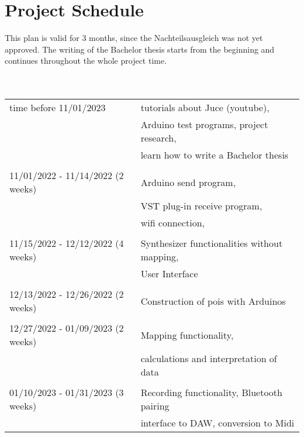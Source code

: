 \newpage
\section{Project Schedule}
This plan is valid for 3 months, since the Nachteilsausgleich was not yet approved. The writing of the Bachelor thesis starts from the beginning and continues throughout the whole project time.
\\ \\ \\
\begin{tabular}{l l}
	time before 11/01/2023				& 	tutorials about Juce (youtube), \\
										&	Arduino test programs, project research, \\
										&	learn how to write a Bachelor thesis \\ \\
	11/01/2022 - 11/14/2022	(2 weeks)	& 	Arduino send program, \\ 
										&	VST plug-in receive program, \\
										&	wifi connection, \\ \\
	11/15/2022 - 12/12/2022 (4 weeks)	&   Synthesizer functionalities without mapping, \\ 
										&	User Interface \\ \\
	12/13/2022 - 12/26/2022 (2 weeks) 	&	Construction of pois with Arduinos \\ \\
	12/27/2022 - 01/09/2023 (2 weeks)	& 	Mapping functionality, \\
										&	calculations and interpretation of data \\ \\
	01/10/2023 - 01/31/2023 (3 weeks)	&	Recording functionality, Bluetooth pairing \\
										&	interface to DAW, conversion to Midi
\end{tabular}
